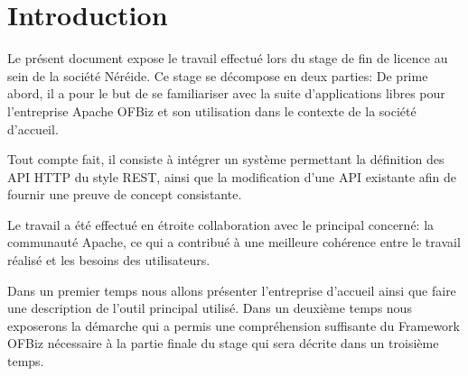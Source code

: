 \chapter{Introduction}

Le présent document expose le travail effectué lors du stage de fin de licence au sein de la société Néréide.
Ce stage se décompose en deux parties: 
De prime abord, il a pour le but de se familiariser avec la suite d'applications libres
pour l'entreprise
Apache OFBiz et son utilisation dans le contexte de la société d'accueil. 

Tout compte fait, il consiste à intégrer un système permettant la définition des API HTTP
du style REST,
 ainsi que la modification d'une API existante afin de fournir une preuve de concept consistante. 

Le travail a été effectué en étroite collaboration avec le principal concerné: la communauté Apache,
ce qui a contribué à une meilleure cohérence entre le travail réalisé et les besoins 
des utilisateurs.

Dans un premier temps nous allons présenter l'entreprise d'accueil ainsi que faire une description de
l'outil principal utilisé.
Dans un deuxième temps nous exposerons la démarche qui a permis une compréhension suffisante du Framework OFBiz
 nécessaire à la partie finale du stage qui sera décrite dans un troisième temps. 

